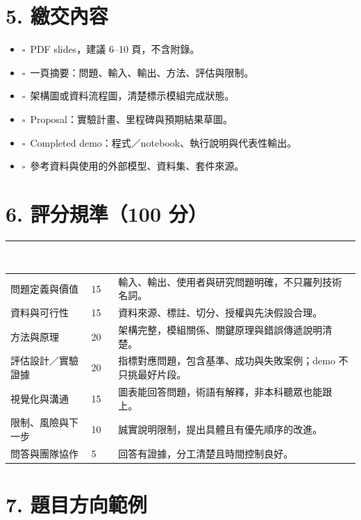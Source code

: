 \documentclass[11pt]{article}
\newcommand{\checkbox}{\(\square\)}
\begin{document}
\section{5. 繳交內容}

\begin{itemize}[leftmargin=1.6em,itemsep=4pt]
  \item \checkbox\ PDF slides，建議 6--10 頁，不含附錄。
  \item \checkbox\ 一頁摘要：問題、輸入、輸出、方法、評估與限制。
  \item \checkbox\ 架構圖或資料流程圖，清楚標示模組完成狀態。
  \item \checkbox\ Proposal：實驗計畫、里程碑與預期結果草圖。
  \item \checkbox\ Completed demo：程式／notebook、執行說明與代表性輸出。
  \item \checkbox\ 參考資料與使用的外部模型、資料集、套件來源。
\end{itemize}

\section{6. 評分規準（100 分）}

\begin{tabularx}{\textwidth}{|Y|C{1.5cm}|Y|}\hline
{}\textcolor{white}{\textbf{面向}} & \textcolor{white}{\textbf{分數}} & \textcolor{white}{\textbf{判準}} \\ \hline
問題定義與價值 & 15 & 輸入、輸出、使用者與研究問題明確，不只羅列技術名詞。 \\ \hline
資料與可行性 & 15 & 資料來源、標註、切分、授權與先決假設合理。 \\ \hline
方法與原理 & 20 & 架構完整，模組關係、關鍵原理與錯誤傳遞說明清楚。 \\ \hline
評估設計／實驗證據 & 20 & 指標對應問題，包含基準、成功與失敗案例；demo 不只挑最好片段。 \\ \hline
視覺化與溝通 & 15 & 圖表能回答問題，術語有解釋，非本科聽眾也能跟上。 \\ \hline
限制、風險與下一步 & 10 & 誠實說明限制，提出具體且有優先順序的改進。 \\ \hline
問答與團隊協作 & 5 & 回答有證據，分工清楚且時間控制良好。 \\ \hline
\end{tabularx}

\section{7. 題目方向範例}
\end{document}
